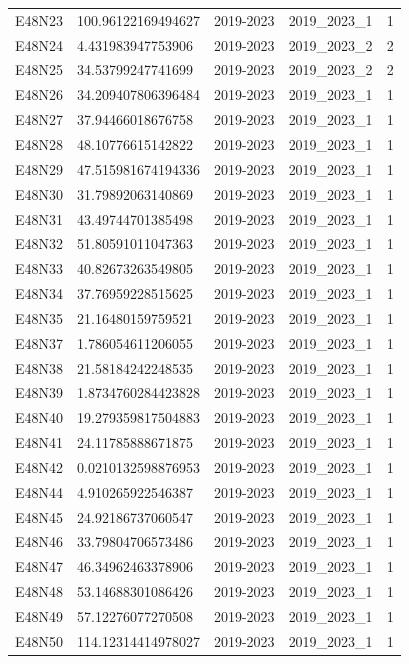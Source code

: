 \begin{landscape}
\begin{longtable}{lllll}
E48N23 & 100.96122169494627 & 2019-2023 & 2019\_2023\_1 & 1 \\
E48N24 & 4.431983947753906 & 2019-2023 & 2019\_2023\_2 & 2 \\
E48N25 & 34.53799247741699 & 2019-2023 & 2019\_2023\_2 & 2 \\
E48N26 & 34.209407806396484 & 2019-2023 & 2019\_2023\_1 & 1 \\
E48N27 & 37.94466018676758 & 2019-2023 & 2019\_2023\_1 & 1 \\
E48N28 & 48.10776615142822 & 2019-2023 & 2019\_2023\_1 & 1 \\
E48N29 & 47.515981674194336 & 2019-2023 & 2019\_2023\_1 & 1 \\
E48N30 & 31.79892063140869 & 2019-2023 & 2019\_2023\_1 & 1 \\
E48N31 & 43.49744701385498 & 2019-2023 & 2019\_2023\_1 & 1 \\
E48N32 & 51.80591011047363 & 2019-2023 & 2019\_2023\_1 & 1 \\
E48N33 & 40.82673263549805 & 2019-2023 & 2019\_2023\_1 & 1 \\
E48N34 & 37.76959228515625 & 2019-2023 & 2019\_2023\_1 & 1 \\
E48N35 & 21.16480159759521 & 2019-2023 & 2019\_2023\_1 & 1 \\
E48N37 & 1.786054611206055 & 2019-2023 & 2019\_2023\_1 & 1 \\
E48N38 & 21.58184242248535 & 2019-2023 & 2019\_2023\_1 & 1 \\
E48N39 & 1.8734760284423828 & 2019-2023 & 2019\_2023\_1 & 1 \\
E48N40 & 19.279359817504883 & 2019-2023 & 2019\_2023\_1 & 1 \\
E48N41 & 24.11785888671875 & 2019-2023 & 2019\_2023\_1 & 1 \\
E48N42 & 0.0210132598876953 & 2019-2023 & 2019\_2023\_1 & 1 \\
E48N44 & 4.910265922546387 & 2019-2023 & 2019\_2023\_1 & 1 \\
E48N45 & 24.92186737060547 & 2019-2023 & 2019\_2023\_1 & 1 \\
E48N46 & 33.79804706573486 & 2019-2023 & 2019\_2023\_1 & 1 \\
E48N47 & 46.34962463378906 & 2019-2023 & 2019\_2023\_1 & 1 \\
E48N48 & 53.14688301086426 & 2019-2023 & 2019\_2023\_1 & 1 \\
E48N49 & 57.12276077270508 & 2019-2023 & 2019\_2023\_1 & 1 \\
E48N50 & 114.12314414978027 & 2019-2023 & 2019\_2023\_1 & 1 \\

\end{longtable}
\end{landscape}
